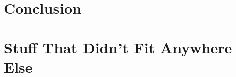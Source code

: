 \documentclass[a4paper,oneside,11pt]{book}
\theoremstyle{definition}
\begin{document}
\chapter{Conclusion}



\appendix
\chapter{Stuff That Didn't Fit Anywhere Else}




\end{document}
